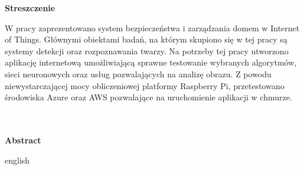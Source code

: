 \vspace*{\fill}
\begin{center}
{\centering \Huge \bfseries Streszczenie}\\
\end{center}
W pracy zaprezentowano system bezpieczeństwa i zarządzania domem w Internet of Things. Głównymi obiektami badań, na którym skupiono się w tej pracy są systemy detekcji oraz rozpoznawania twarzy. Na potrzeby tej pracy utworzono aplikację internetową umożliwiającą sprawne testowanie wybranych algorytmów, sieci neuronowych oraz usług pozwalających na analizę obrazu. Z powodu niewystarczającej mocy obliczeniowej platformy Raspberry Pi, przetestowano środowiska Azure oraz AWS pozwalające na uruchomienie aplikacji w chmurze.
\\
\\
\\
\begin{center}
 {\Huge \bfseries  Abstract}\\
\end{center}
english
\\
\\
\\
\\
\\
\\
\\
\\
\\
\vspace*{\fill}